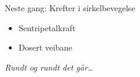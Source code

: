 \documentclass[aspectratio=169, 12pt]{beamer}
\begin{document}
\begin{frame}
\begin{center}
  \Huge{Neste gang: Krefter i sirkelbevegelse}
  \begin{itemize}
    \item Sentripetalkraft
    \item Dosert veibane
  \end{itemize}
  \vspace{6mm}
  {\normalsize\itshape Rundt og rundt det går\ldots}
\end{center}
\end{frame}
\end{document}
